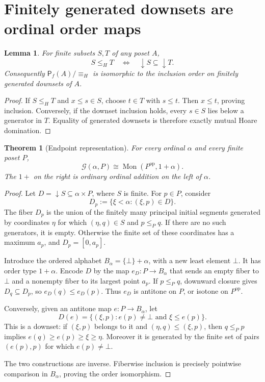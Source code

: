 \documentclass[11pt,a4paper]{article}
\newtheorem{theorem}{Theorem}[section]
\newtheorem{lemma}[lemma]{Lemma}
\theoremstyle{definition}
\theoremstyle{remark}
\newcommand{\Mon}{\operatorname{Mon}}
\newcommand{\Pf}{\mathsf{P}_{\!f}}
\newcommand{\Grid}{\mathcal{G}}
\newcommand{\op}{\mathrm{op}}
\begin{document}
\section{Finitely generated downsets are ordinal order maps}

\begin{lemma}\label{lem:downsetquotient}
For finite subsets $S,T$ of any poset $A$,
\[
 S\leq_HT\quad\Longleftrightarrow\quad\downarrow S\subseteq\downarrow T.
\]
Consequently $\Pf(A)/{\equiv_H}$ is isomorphic to the inclusion order on
finitely generated downsets of $A$.
\end{lemma}
\begin{proof}
If $S\leq_HT$ and $x\leq s\in S$, choose $t\in T$ with $s\leq t$.
Then $x\leq t$, proving inclusion. Conversely, if the downset inclusion
holds, every $s\in S$ lies below a generator in $T$. Equality of generated
downsets is therefore exactly mutual Hoare domination.
\end{proof}

\begin{theorem}[Endpoint representation]\label{thm:reduction}
For every ordinal $\alpha$ and every finite poset $P$,
\begin{equation}\label{eq:reduction}
 \boxed{\Grid(\alpha,P)\cong\Mon(P^{\op},1+\alpha).}
\end{equation}
The $1+$ on the right is ordinary ordinal addition on the left of
$\alpha$.
\end{theorem}
\begin{proof}
Let $D=\downarrow S\subseteq\alpha\times P$, where $S$ is finite. For
$p\in P$, consider
\[
 D_p:=\{\xi<\alpha:(\xi,p)\in D\}.
\]
The fiber $D_p$ is the union of the finitely many principal initial
segments generated by coordinates $\eta$ for which $(\eta,q)\in S$ and
$p\leq_Pq$. If there are no such generators, it is empty. Otherwise the
finite set of these coordinates has a maximum $a_p$, and
$D_p=[0,a_p]$.

Introduce the ordered alphabet $B_\alpha=\{\bot\}+\alpha$, with a new
least element $\bot$. It has order type $1+\alpha$. Encode $D$ by the map
$e_D:P\to B_\alpha$ that sends an empty fiber to $\bot$ and a nonempty
fiber to its largest point $a_p$. If $p\leq_Pq$, downward closure gives
$D_q\subseteq D_p$, so $e_D(q)\leq e_D(p)$. Thus $e_D$ is antitone on
$P$, or isotone on $P^{\op}$.

Conversely, given an antitone map $e:P\to B_\alpha$, let
\[
 D(e)=\{(\xi,p): e(p)\ne\bot\text{ and }\xi\leq e(p)\}.
\]
This is a downset: if $(\xi,p)$ belongs to it and
$(\eta,q)\leq(\xi,p)$, then $q\leq_Pp$ implies
$e(q)\geq e(p)\geq\xi\geq\eta$. Moreover it is generated by the finite
set of pairs $(e(p),p)$ for which $e(p)\ne\bot$.

The two constructions are inverse. Fiberwise inclusion is precisely
pointwise comparison in $B_\alpha$, proving the order isomorphism.
\end{proof}
\end{document}
